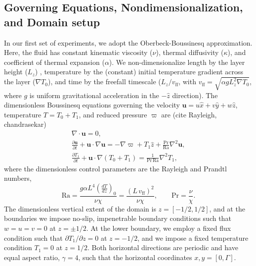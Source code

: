 \documentclass[aps, pre, onecolumn, nofootinbib, notitlepage, groupedaddress, amsfonts, amssymb, amsmath, longbibliography]{revtex4-1}
\newcommand{\DivU}{\ensuremath{\nabla\cdot\bm{u}}}
\newcommand{\grad}{\ensuremath{\nabla}}
\begin{document}
\subsection{Governing Equations, Nondimensionalization, and Domain setup}
In our first set of experiments, we adopt the Oberbeck-Boussinesq approximation.  Here, the
fluid has constant kinematic viscosity ($\nu$), thermal diffusivity ($\kappa$), and coefficient
of thermal expansion ($\alpha$).  We non-dimensionalize length by the layer height ($L_z$) ,
temperature by the (constant) initial temperature gradient across the layer ($\grad T_0$), and time
by the freefall timescale ($L_z / v_{\text{ff}}$, with $v_{\text{ff}} = \sqrt{\alpha g L_z^2 \grad T_0}$, where $g$ is 
uniform gravitational acceleration in the $-\hat{z}$ direction). The dimensionless Boussinesq
equations governing the velocity $\bm{u} = u\hat{x} + v\hat{y} + w\hat{z}$, temperature
$T = T_0 + T_1$, and reduced pressure $\varpi$ are (cite Rayleigh, chandrasekar)
\begin{gather}
\DivU = 0, 
	\label{eqn:incompressible}
\\
\frac{\partial \bm{u}}{\partial t} + \bm{u}\cdot\grad\bm{u} =
-\grad\varpi + T_1\hat{z} + \frac{\text{Pr}}{\text{Ra}}\grad^2\bm{u}, 
	\label{eqn:bouss_momentum_eqn}
\\
\frac{\partial T_1}{\partial t} + \bm{u}\cdot\grad(T_0 + T_1) = \frac{1}{\text{Pr}\,\text{Ra}}\grad^2 T_1,
	\label{eqn:bouss_energy_eqn}
\end{gather}
where the dimensionless control parameters are the Rayleigh and Prandtl numbers,
\begin{equation}
\text{Ra} = \frac{g \alpha L^4 \left(\frac{dT}{dz}\right)_0}{\nu\chi} = \frac{(L\,v_{\text{ff}})^2}{\nu\chi}, \qquad \text{Pr} = \frac{\nu}{\chi}.
\end{equation}
The dimensionless vertical extent of the domain is $z = [-1/2, 1/2]$, and at the boundaries
we impose no-slip, impenetrable boundary conditions such that $w = u = v = 0$ at $z = \pm 1/2$.
At the lower boundary, we employ a fixed flux condition such that $\partial T_1 / \partial z = 0$
at $z = -1/2$, and we impose a fixed temperature condition $T_1 = 0$ at $z = 1/2$. Both
horizontal directions are periodic and have equal aspect ratio, $\gamma = 4$, such that
the horizontal coordinates $x, y = [0, \Gamma]$.
\end{document}
